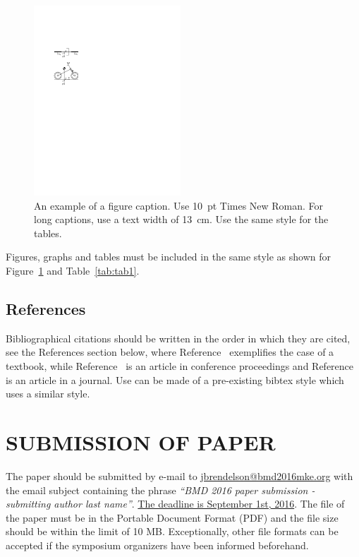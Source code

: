 \documentclass{bmd2016p}
\begin{document}
\begin{figure}[h!]
\begin{center}
  \includegraphics[width=55mm]{figure1}
  \caption{An example of a figure caption. Use 10~pt Times New Roman.
           For long captions, use a text width of 13~cm.
           Use the same style for the tables.} \label{fig:fig1}
\end{center}
\end{figure}
Figures, graphs and tables must be included in the same style as shown for 
Figure~\ref{fig:fig1} and Table~\ref{tab:tab1}.


\subsection{References}

Bibliographical citations should be written in the order in which they are 
cited, see the References section below, where Reference~\cite{Pac02} 
exemplifies the case of a textbook, while Reference~\cite{Ber07} is an article 
in conference proceedings and Reference~\cite{Sha71} is an article in a 
journal. Use can be made of a pre-existing bibtex style which uses a similar 
style.


\section{SUBMISSION OF PAPER}

The paper should be submitted by e-mail to \href{mailto:jbrendelson@bmd2016mke.org}{jbrendelson@bmd2016mke.org} with the email subject containing the phrase \textit{``BMD 2016 paper submission - submitting author last name''}. \uline{The deadline is September 1st, 2016}. The file of the paper must be in the Portable Document Format (PDF) and the file size should be within the limit of 10 MB. Exceptionally, other file formats can be accepted if the symposium organizers have been informed beforehand. 
\end{document}
